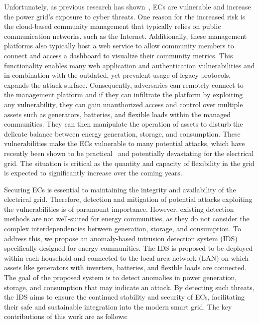 Unfortunately, as previous research has shown~\cite{novel-EC, impact-EC}, ECs are vulnerable and increase the power grid's exposure to cyber threats. One reason for the increased risk is the cloud-based community management that typically relies on public communication networks, such as the Internet. Additionally, these management platforms also typically host a web service to allow community members to connect and access a dashboard to visualize their community metrics. This functionality enables many web application and authentication vulnerabilities and in combination with the outdated, yet prevalent usage of legacy protocols, expands the attack surface. Consequently, adversaries can remotely connect to the management platform and if they can infiltrate the platform by exploiting any vulnerability, they can gain unauthorized access and control over multiple assets such as generators, batteries, and flexible loads within the managed communities. They can then manipulate the operation of assets to disturb the delicate balance between energy generation, storage, and consumption. These vulnerabilities make the ECs vulnerable to many potential attacks, which have recently been shown to be practical~\cite{security-bess} and potentially devastating for the electrical grid. The situation is critical as the quantity and capacity of flexibility in the grid is expected to significantly increase over the coming years.


Securing ECs is essential to maintaining the integrity and availability of the electrical grid. Therefore, detection and mitigation of potential attacks exploiting the vulnerabilities is of paramount importance. However, existing detection methods are not well-suited for energy communities, as they do not consider the complex interdependencies between generation, storage, and consumption. To address this, we propose an anomaly-based intrusion detection system (IDS) specifically designed for energy communities. The IDS is proposed to be deployed within each household and connected to the local area network (LAN) on which assets like generators with inverters, batteries, and flexible loads are connected. The goal of the proposed system is to detect anomalies in power generation, storage, and consumption that may indicate an attack. By detecting such threats, the IDS aims to ensure the continued stability and security of ECs, facilitating their safe and sustainable integration into the modern smart grid. The key contributions of this work are as follows:

